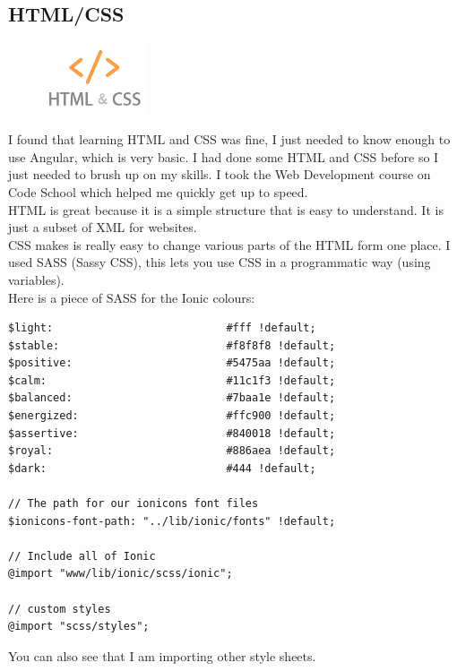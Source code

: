 \subsection{HTML/CSS}
\begin{figure}
\includegraphics[width=3cm]{img/mobile-app/logos/html-css.jpg}
\end{figure} 
I found that learning HTML \cite{html} and CSS \cite{css} was fine, I just needed to know enough to use Angular, which is very basic.
I had done some HTML and CSS before so I just needed to brush up on my skills.
I took the Web Development \cite{codeschool_webdev} course on Code School which helped me quickly get up to speed.
\\

HTML is great because it is a simple structure that is easy to understand.
It is just a subset of XML for websites.
\\

CSS makes is really easy to change various parts of the HTML form one place.
I used SASS (Sassy CSS), this lets you use CSS in a programmatic way (using variables).
\\

Here is a piece of SASS for the Ionic colours:
\begin{verbatim}
$light:                           #fff !default;
$stable:                          #f8f8f8 !default;
$positive:                        #5475aa !default; 
$calm:                            #11c1f3 !default;
$balanced:                        #7baa1e !default; 
$energized:                       #ffc900 !default;
$assertive:                       #840018 !default;
$royal:                           #886aea !default;
$dark:                            #444 !default;

// The path for our ionicons font files
$ionicons-font-path: "../lib/ionic/fonts" !default;

// Include all of Ionic
@import "www/lib/ionic/scss/ionic";

// custom styles
@import "scss/styles";
\end{verbatim}
You can also see that I am importing other style sheets.


